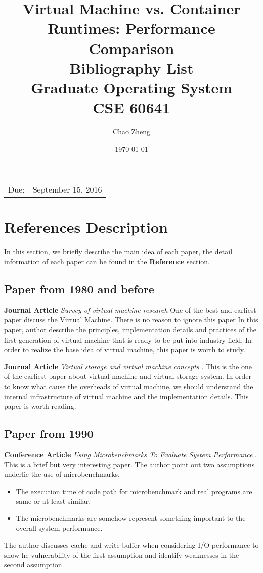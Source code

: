 \documentclass{article}
\title{{\textbf{Virtual Machine vs. Container Runtimes: Performance Comparison}} \\
       \vspace{3\baselineskip}
       {\large Bibliography List} \\
       \vspace{3\baselineskip}
       {\large Graduate Operating System} \\ 
       {\large CSE 60641} %
      }
\date{\today} %
\author{Chao Zheng}
\begin{document}
\maketitle %

\begin{center}
\begin{tabular}{l r}
Due:& September 15, 2016\\ 
\end{tabular}
\end{center}

\pagebreak

\section{References Description}

In this section, we briefly describe the main idea of each paper, the detail information of each
paper can be found in the \textbf{Reference} section.

\subsection{Paper from 1980 and before}

\textbf{Journal Article} \emph{Survey of virtual machine research}\cite{goldberg1974survey} One
of the best and earliest paper discuss the Virtual Machine. There is no reason to ignore this paper  
In this paper, author describe the principles, implementation details and practices of the first
generation of virtual machine that is ready to be put into industry field. In order to realize the
base idea of virtual machine, this paper is worth to study. 

\medskip

\textbf{Journal Article} \emph{Virtual storage and virtual machine concepts}
\cite{parmelee1972virtual}. This is the one of the earliest paper about virtual machine 
and virtual storage system. In order to know what cause the overheads of virtual machine, we should
understand the internal infrastructure of virtual machine and the implementation details. This paper 
is worth reading.

\subsection{Paper from 1990}

\textbf{Conference Article} \emph{Using Microbenchmarks To Evaluate System Performance}
\cite{bershad1992using}. This is a brief but very interesting paper. The author point out two 
assumptions underlie the use of microbenchmarks.
\begin{itemize}
    \item The execution time of code path for microbenchmark and real programs are same or at least 
        similar.
    \item The microbenchmarks are somehow represent something important to the overall 
        system performance.
\end{itemize}
The author discusses cache and write buffer when considering I/O performance to show he vulnerability
of the first assumption and identify weaknesses in the second assumption.
\end{document}
